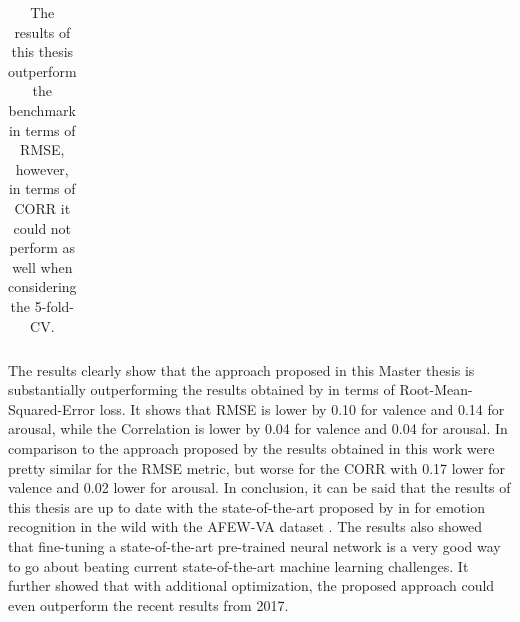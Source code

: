 \begin{table}[H]
\begin{center}
\begin{tabular}{@{}lcccccc@{}}
\end{tabular}
\caption{The results of this thesis outperform the benchmark in terms of RMSE, however, in terms of CORR it could not perform as well when considering the 5-fold-CV.}
\label{tab:ResultsComparison}
\end{center}
\end{table}

The results clearly show that the approach proposed in this Master thesis is substantially outperforming the results obtained by \citet{Kossaifi:2017:AFEW-VADatabase} in terms of Root-Mean-Squared-Error loss. It shows that RMSE is lower by 0.10 for valence and 0.14 for arousal, while the Correlation is lower by 0.04 for valence and 0.04 for arousal. In comparison to the approach proposed by \citet{Handrich:2020:SimultaneousPredVA} the results obtained in this work were pretty similar for the RMSE metric, but worse for the CORR with 0.17 lower for valence and 0.02 lower for arousal.
\newline\newline
In conclusion, it can be said that the results of this thesis are up to date with the state-of-the-art proposed by \citet{Handrich:2020:SimultaneousPredVA} in \citeyear{Handrich:2020:SimultaneousPredVA} for emotion recognition in the wild with the AFEW-VA dataset \citep{Kossaifi:2017:AFEW-VADatabase}. The results also showed that fine-tuning a state-of-the-art pre-trained neural network is a very good way to go about beating current state-of-the-art machine learning challenges. It further showed that with additional optimization, the proposed approach could even outperform the recent results from 2017.

